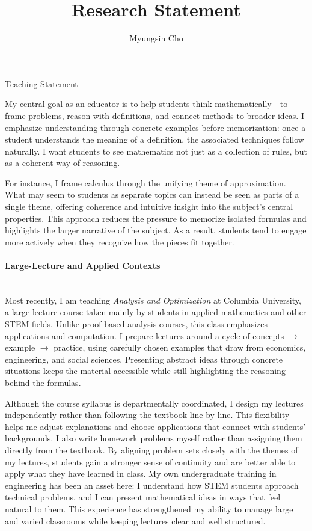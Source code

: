 \documentclass[11pt]{article}
\title{Research Statement}
\author{Myungsin Cho}
\date{}
\begin{document}
\begin{center}\LARGE{Teaching Statement}\end{center}

My central goal as an educator is to help students think mathematically—to frame problems, reason with definitions, and connect methods to broader ideas.
I emphasize understanding through concrete examples before memorization: once a student understands the meaning of a definition, the associated techniques follow naturally.
I want students to see mathematics not just as a collection of rules, but as a coherent way of reasoning.

For instance, I frame calculus through the unifying theme of approximation. 
What may seem to students as separate topics can instead be seen as parts of a single theme, offering coherence and intuitive insight into the subject’s central properties. 
This approach reduces the pressure to memorize isolated formulas and highlights the larger narrative of the subject. 
As a result, students tend to engage more actively when they recognize how the pieces fit together.

\paragraph{Large-Lecture and Applied Contexts}\quad \\
Most recently, I am teaching {\it Analysis and Optimization} at Columbia University, a large-lecture course taken mainly by students in applied mathematics and other STEM fields. 
Unlike proof-based analysis courses, this class emphasizes applications and computation. 
I prepare lectures around a cycle of concepts $\to$ example $\to$ practice, using carefully chosen examples that draw from economics, engineering, and social sciences.
Presenting abstract ideas through concrete situations keeps the material accessible while still highlighting the reasoning behind the formulas.

Although the course syllabus is departmentally coordinated, I design my lectures independently rather than following the textbook line by line.
This flexibility helps me adjust explanations and choose applications that connect with students’ backgrounds.
I also write homework problems myself rather than assigning them directly from the textbook. 
By aligning problem sets closely with the themes of my lectures, students gain a stronger sense of continuity and are better able to apply what they have learned in class.
My own undergraduate training in engineering has been an asset here: I understand how STEM students approach technical problems, and I can present mathematical ideas in ways that feel natural to them. 
This experience has strengthened my ability to manage large and varied classrooms while keeping lectures clear and well structured.
\end{document}
